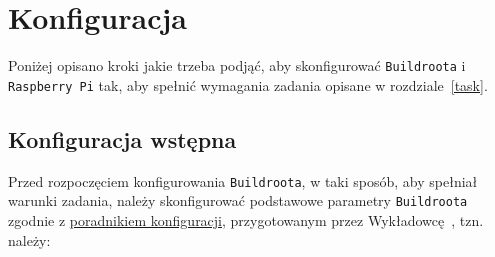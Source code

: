\documentclass{article}
\begin{document}

\section{Konfiguracja}

Poniżej opisano kroki jakie trzeba podjąć, aby skonfigurować \texttt{Buildroota} i \texttt{Raspberry~Pi} tak, aby spełnić wymagania zadania opisane w rozdziale~\ref{task}.


\subsection{Konfiguracja wstępna}

Przed rozpoczęciem konfigurowania \texttt{Buildroota}, w taki sposób, aby spełniał warunki zadania, należy skonfigurować podstawowe parametry \texttt{Buildroota} zgodnie z \href{http://wzab.cba.pl/LINSW/poradnik\_laboratorium.pdf}{poradnikiem konfiguracji}, przygotowanym przez Wykładowcę~\cite{www:wzab}, tzn. należy:
\end{document}

